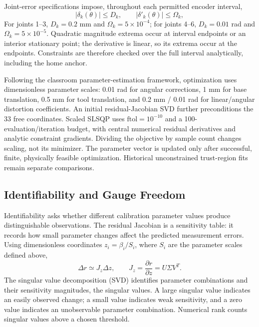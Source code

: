 \documentclass[11pt,letterpaper]{article}
\begin{document}
Joint-error specifications impose, throughout each permitted encoder interval,
\begin{equation}\label{eq:physical_constraints}
 |\delta_k(\theta)|\leq D_k,\qquad
 |\delta'_k(\theta)|\leq\Omega_k,
\end{equation}
For joints 1--3, $D_k=0.2$ mm and $\Omega_k=5\times10^{-4}$; for joints 4--6, $D_k=0.01$ rad and $\Omega_k=5\times10^{-5}$. Quadratic magnitude extrema occur at interval endpoints or an interior stationary point; the derivative is linear, so its extrema occur at the endpoints. Constraints are therefore checked over the full interval analytically, including the home anchor.

Following the classroom parameter-estimation framework, optimization uses dimensionless parameter scales: 0.01 rad for angular corrections, 1 mm for base translation, 0.5 mm for tool translation, and 0.2 mm / 0.01 rad for linear/angular distortion coefficients. An initial residual-Jacobian SVD further preconditions the 33 free coordinates. Scaled SLSQP uses $\mathrm{ftol}=10^{-10}$ and a 100-evaluation/iteration budget, with central numerical residual derivatives and analytic constraint gradients. Dividing the objective by sample count changes scaling, not its minimizer. The parameter vector is updated only after successful, finite, physically feasible optimization. Historical unconstrained trust-region fits remain separate comparisons.

\subsection{Identifiability and Gauge Freedom}
Identifiability asks whether different calibration parameter values produce distinguishable observations. The residual Jacobian is a sensitivity table: it records how small parameter changes affect the predicted measurement errors. Using dimensionless coordinates $z_i=\beta_i/S_i$, where $S_i$ are the parameter scales defined above,
\begin{equation*}
\Delta r \simeq J_z\Delta z,
\qquad
J_z=\frac{\partial r}{\partial z}=U\Sigma V^T.
\end{equation*}
The singular value decomposition (SVD) identifies parameter combinations and their sensitivity magnitudes, the singular values. A large singular value indicates an easily observed change; a small value indicates weak sensitivity, and a zero value indicates an unobservable parameter combination. Numerical rank counts singular values above a chosen threshold.
\end{document}
